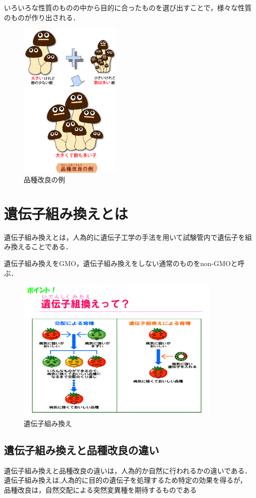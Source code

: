 いろいろな性質のものの中から目的に合ったものを選び出すことで，様々な性質のものが作り出される．

\begin{figure}[htb]
\centering
\includegraphics[width=5cm]{kinoko8.png}
\caption{品種改良の例}\label{図}
\end{figure}

\section{遺伝子組み換えとは}
遺伝子組み換えとは，人為的に遺伝子工学の手法を用いて試験管内で遺伝子を組み換えることである．

遺伝子組み換えをGMO，遺伝子組み換えをしない通常のものをnon-GMOと呼ぶ．\cite{kinoko2015}

\begin{figure}[htb]
\centering
\includegraphics[width=10cm]{iden.jpg}
\caption{遺伝子組み換え}\label{図}
\end{figure}

\subsection{遺伝子組み換えと品種改良の違い}
遺伝子組み換えと品種改良の違いは，人為的か自然に行われるかの違いである．遺伝子組み換えは,人為的に目的の遺伝子を処理するため特定の効果を得るが，品種改良は，自然交配による突然変異種を期待するものである

